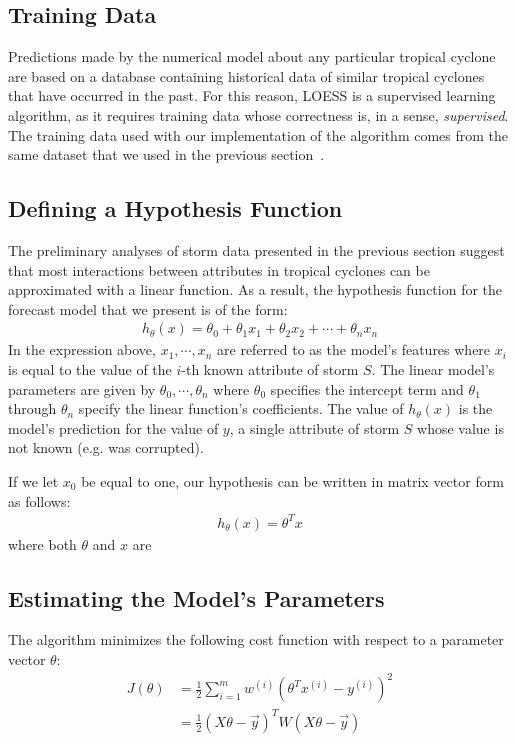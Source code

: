 \documentclass[letterpaper,twocolumn,10pt]{article}
\begin{document}
\subsection{Training Data}
Predictions made by the numerical model about any particular tropical cyclone
are based on a database containing historical data of similar tropical cyclones
that have occurred in the past. For this reason, LOESS is a supervised learning
algorithm, as it requires training data whose correctness is, in a sense,
\emph{supervised}. The training data used with our implementation of the
algorithm comes from the same dataset that we used in the previous
section~\cite{BestTrackDataset}.

\subsection{Defining a Hypothesis Function}
The preliminary analyses of storm data presented in the previous section
suggest that most interactions between attributes in tropical cyclones can be
approximated with a linear function. As a result, the hypothesis function for
the forecast model that we present is of the form:
\begin{align}
  h_{\theta}(x) = \theta_0 + \theta_1 x_1 + \theta_2 x_2 + \cdots + \theta_n x_n
\end{align}
In the expression above, $x_1, \cdots, x_n$ are referred to as the model's
features where $x_i$ is equal to the value of the \mbox{$i$-th} known attribute
of storm $S$. The linear model's parameters are given by
$\theta_0,\cdots,\theta_n$ where $\theta_0$ specifies the intercept term and
$\theta_1$ through $\theta_n$ specify the linear function's coefficients. The
value of $h_\theta(x)$ is the model's prediction for the value of $y$, a single
attribute of storm $S$ whose value is not known (e.g. was corrupted).

If we let $x_0$ be equal to one, our hypothesis can be written in matrix vector
form as follows:
\begin{align}
  h_\theta(x) = \theta^T x
\end{align}
where both $\theta$ and $x$ are 
~\cite{LinearRegression}

\subsection{Estimating the Model's Parameters}
The algorithm minimizes the following cost function with respect to a parameter
vector $\theta$:
\begin{align}
  J(\theta) &= \frac{1}{2}\sum_{i=1}^{m}{
                w^{(i)}\left(\theta^T x^{(i)} - y^{(i)}\right)^2
              }\\
            &= \frac{1}{2}(X\theta - \vec{y})^T W(X\theta - \vec{y})
\end{align}






\end{document}
